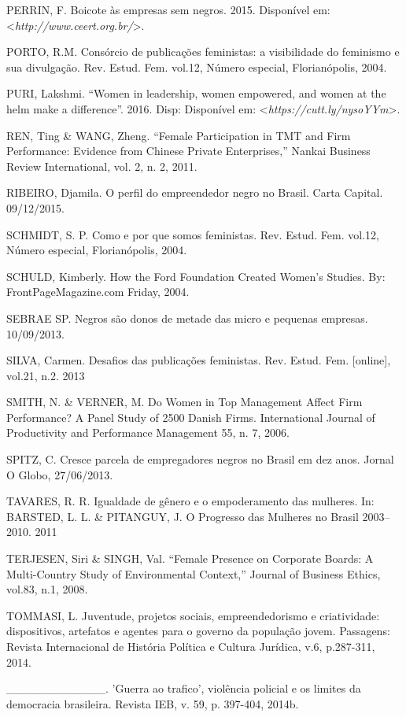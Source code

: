 \begin{Parskip}
PERRIN, F. Boicote às empresas sem negros. 2015.
Disponível em: \textless{}\emph{http://www.ceert.org.br/}\textgreater{}.

PORTO, R.M. Consórcio de publicações feministas: a visibilidade do
feminismo e sua divulgação. Rev. Estud. Fem. vol.12, Número especial,
Florianópolis, 2004.

PURI, Lakshmi. ``Women in leadership, women empowered, and women at the
helm make a difference''. 2016. Disp:
Disponível em: \textless{}\emph{https://cutt.ly/nysoYYm}\textgreater{}.

REN, Ting \& WANG, Zheng. ``Female Participation in TMT and Firm
Performance: Evidence from Chinese Private Enterprises,'' Nankai
Business Review International, vol. 2, n. 2, 2011.

RIBEIRO, Djamila. O perfil do empreendedor negro no Brasil. Carta
Capital. 09/12/2015.

SCHMIDT, S. P. Como e por que somos feministas. Rev. Estud. Fem. vol.12,
Número especial, Florianópolis, 2004.

SCHULD, Kimberly. How the Ford Foundation Created Women's Studies. By:
FrontPageMagazine.com \textbar{} Friday, 2004.

SEBRAE SP. Negros são donos de metade das micro e pequenas empresas.
10/09/2013.

SILVA, Carmen. Desafios das publicações feministas. Rev. Estud. Fem.
{[}online{]}, vol.21, n.2. 2013

SMITH, N. \& VERNER, M. Do Women in Top Management Affect Firm
Performance? A Panel Study of 2500 Danish Firms. International Journal
of Productivity and Performance Management 55, n. 7, 2006.

SPITZ, C. Cresce parcela de empregadores negros no Brasil em dez anos.
Jornal O Globo, 27/06/2013.

TAVARES, R. R. Igualdade de gênero e o empoderamento das mulheres. In:
BARSTED, L. L. \& PITANGUY, J. O Progresso das Mulheres no Brasil
2003--2010. 2011

TERJESEN, Siri \& SINGH, Val. ``Female Presence on Corporate Boards: A
Multi-Country Study of Environmental Context,'' Journal of Business
Ethics, vol.83, n.1, 2008.

TOMMASI, L. Juventude, projetos sociais, empreendedorismo e
criatividade: dispositivos, artefatos e agentes para o governo da
população jovem. Passagens: Revista Internacional de História Política e
Cultura Jurídica, v.6, p.287-311, 2014.

\_\_\_\_\_\_\_\_\_\_\_\_. 'Guerra ao trafico', violência policial e os
limites da democracia brasileira. Revista IEB, v. 59, p. 397-404, 2014b.


\end{Parskip}
